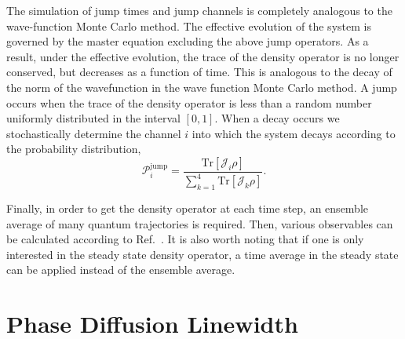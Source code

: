 \documentclass[aps,
twocolumn,
superscriptaddress,groupedaddress]{revtex4}
\begin{document}
The simulation of jump times and jump channels is completely analogous
to the wave-function Monte Carlo method. The effective evolution of the
system is governed by the master equation excluding the above jump
operators. As a result, under the effective evolution, the trace of the
density operator is no longer conserved, but decreases as a function of
time.  This is analogous to the decay of the norm of the wavefunction in
the wave function Monte Carlo method. A jump occurs when the trace of
the density operator is less than a random number uniformly distributed
in the interval $[0,1]$. When a decay occurs we stochastically determine
the channel $i$ into which the system decays according to the
probability distribution,
\begin{equation}
\mathcal{P}_i^{\mathrm{jump}}=\frac{\mathrm{Tr}[\mathcal{J}_i\rho]}{\sum_{k=1}^4
\mathrm{Tr}[\mathcal{J}_k\rho]}.
\end{equation}

Finally, in order to get the density operator at each time step, an
ensemble average of many quantum trajectories is required. Then, various
observables can be calculated according to Ref.~\cite{PhysRevA.87.062101}. It is
also worth noting that if one is only interested in the steady state
density operator, a time average in the steady state can be applied
instead of the ensemble average.

\section{Phase Diffusion Linewidth}
\label{HakenAppendix}
\end{document}
